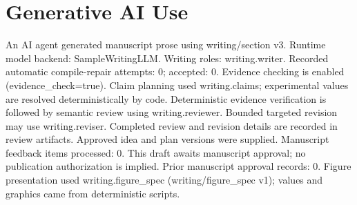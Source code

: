 \section*{Generative AI Use}
An AI agent generated manuscript prose using writing/section v3.
Runtime model backend: SampleWritingLLM.
Writing roles: writing.writer. Recorded automatic compile-repair attempts: 0; accepted: 0.
Evidence checking is enabled (evidence\_check=true). Claim planning used writing.claims; experimental values are resolved deterministically by code. Deterministic evidence verification is followed by semantic review using writing.reviewer. Bounded targeted revision may use writing.reviser. Completed review and revision details are recorded in review artifacts.
Approved idea and plan versions were supplied. Manuscript feedback items processed: 0. This draft awaits manuscript approval; no publication authorization is implied.
Prior manuscript approval records: 0.
Figure presentation used writing.figure\_spec (writing/figure\_spec v1); values and graphics came from deterministic scripts.
\ifdefined\pdfinfo{}\fi
